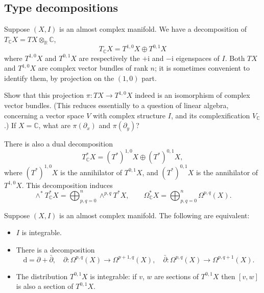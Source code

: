 \documentclass[12pt,letterpaper,reqno]{article}
\numberwithin{equation}{section}
\newcommand{\R}{\ensuremath{\mathbb R}}
\newcommand{\C}{\ensuremath{\mathbb C}}
\newcommand{\I}{{\mathrm i}}
\newcommand{\de}{\mathrm{d}}
\begin{document}
\subsection{Type decompositions}
Suppose $(X,I)$ is an almost complex manifold.
We have a decomposition
of $T_\C X = TX \otimes_\R \C$,
\begin{equation}
T_\C X = T^{1,0} X \oplus T^{0,1} X
  \end{equation}
where $T^{1,0} X$ and $T^{0,1} X$ are
respectively the
$+\I$ and $-\I$ eigenspaces of $I$.
Both $TX$ and $T^{1,0}X$ are complex vector bundles
of rank $n$; it is sometimes convenient to identify
them, by projection on the $(1,0)$ part.

\begin{exercise}
Show that this projection $\pi: TX \to T^{1,0}X$ indeed is an isomorphism
of complex vector bundles. (This reduces essentially
to a question of linear algebra, concerning
a vector space $V$ with complex structure $I$,
and its complexification $V_\C$.) If $X = \C$,
what are $\pi(\partial_x)$ and $\pi(\partial_y)$?
\end{exercise}

There is also a dual decomposition
\begin{equation}
T^*_\C X = (T^*)^{1,0} X \oplus (T^*)^{0,1} X,
  \end{equation}
where $(T^*)^{1,0} X$ is the annihilator of
$T^{0,1} X$, and $(T^*)^{0,1} X$ is the annihilator of
$T^{1,0} X$.
This decomposition induces
\begin{equation}
\wedge^* T^*_\C X = \bigoplus_{p,q=0}^n \wedge^{p,q} T^* X , \qquad \Omega^*_\C X = \bigoplus_{p,q=0}^n \Omega^{p,q}(X).
\end{equation}

\begin{prop} \label{prop:integrability}
Suppose $(X,I)$ is an almost complex manifold. The following are equivalent:
\begin{itemize}
\item $I$ is integrable.
\item There is a decomposition
\begin{equation}
\de = \partial + \bar\partial, \quad \partial: \Omega^{p,q}(X) \to \Omega^{p+1,q}(X), \quad \bar\partial: \Omega^{p,q}(X) \to \Omega^{p,q+1}(X).
\end{equation}
\item The distribution $T^{0,1}X$ is integrable: if $v$, $w$ are
sections of $T^{0,1}X$ then $[v,w]$ is also a section of $T^{0,1}X$.
\end{itemize}
\end{prop}
\end{document}
